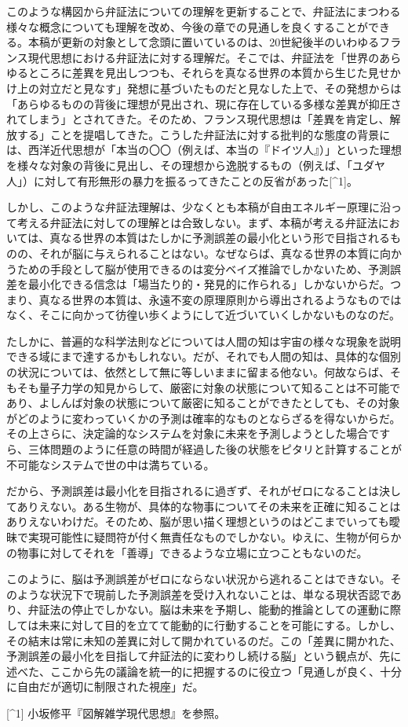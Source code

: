 このような構図から弁証法についての理解を更新することで、弁証法にまつわる様々な概念についても理解を改め、今後の章での見通しを良くすることができる。本稿が更新の対象として念頭に置いているのは、20世紀後半のいわゆるフランス現代思想における弁証法に対する理解だ。そこでは、弁証法を「世界のあらゆるところに差異を見出しつつも、それらを真なる世界の本質から生じた見せかけ上の対立だと見なす」発想に基づいたものだと見なした上で、その発想からは「あらゆるものの背後に理想が見出され、現に存在している多様な差異が抑圧されてしまう」とされてきた。そのため、フランス現代思想は「差異を肯定し、解放する」ことを提唱してきた。こうした弁証法に対する批判的な態度の背景には、西洋近代思想が「本当の〇〇（例えば、本当の『ドイツ人』）」といった理想を様々な対象の背後に見出し、その理想から逸脱するもの（例えば、「ユダヤ人」）に対して有形無形の暴力を振るってきたことの反省があった{[}\^{}1{]}。

しかし、このような弁証法理解は、少なくとも本稿が自由エネルギー原理に沿って考える弁証法に対しての理解とは合致しない。まず、本稿が考える弁証法においては、真なる世界の本質はたしかに予測誤差の最小化という形で目指されるものの、それが脳に与えられることはない。なぜならば、真なる世界の本質に向かうための手段として脳が使用できるのは変分ベイズ推論でしかないため、予測誤差を最小化できる信念は「場当たり的・発見的に作られる」しかないからだ。つまり、真なる世界の本質は、永遠不変の原理原則から導出されるようなものではなく、そこに向かって彷徨い歩くようにして近づいていくしかないものなのだ。

たしかに、普遍的な科学法則などについては人間の知は宇宙の様々な現象を説明できる域にまで達するかもしれない。だが、それでも人間の知は、具体的な個別の状況については、依然として無に等しいままに留まる他ない。何故ならば、そもそも量子力学の知見からして、厳密に対象の状態について知ることは不可能であり、よしんば対象の状態について厳密に知ることができたとしても、その対象がどのように変わっていくかの予測は確率的なものとならざるを得ないからだ。その上さらに、決定論的なシステムを対象に未来を予測しようとした場合ですら、三体問題のように任意の時間が経過した後の状態をピタリと計算することが不可能なシステムで世の中は満ちている。

だから、予測誤差は最小化を目指されるに過ぎず、それがゼロになることは決してありえない。ある生物が、具体的な物事についてその未来を正確に知ることはありえないわけだ。そのため、脳が思い描く理想というのはどこまでいっても曖昧で実現可能性に疑問符が付く無責任なものでしかない。ゆえに、生物が何らかの物事に対してそれを「善導」できるような立場に立つこともないのだ。

このように、脳は予測誤差がゼロにならない状況から逃れることはできない。そのような状況下で現前した予測誤差を受け入れないことは、単なる現状否認であり、弁証法の停止でしかない。脳は未来を予期し、能動的推論としての運動に際しては未来に対して目的を立てて能動的に行動することを可能にする。しかし、その結末は常に未知の差異に対して開かれているのだ。この「差異に開かれた、予測誤差の最小化を目指して弁証法的に変わりし続ける脳」という観点が、先に述べた、ここから先の議論を統一的に把握するのに役立つ「見通しが良く、十分に自由だが適切に制限された視座」だ。

{[}\^{}1{]} 小坂修平『図解雑学現代思想』を参照。
